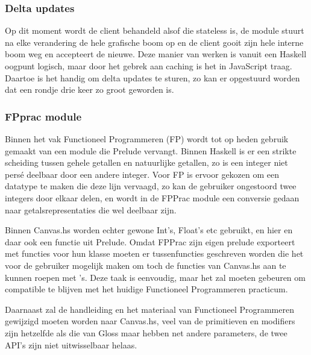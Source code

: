 \subsubsection{Delta updates} \label{subsub:deltas}
Op dit moment wordt de client behandeld alsof die stateless is, de module stuurt na elke verandering de hele grafische boom op en de client gooit zijn hele interne boom weg en accepteert de nieuwe. Deze manier van werken is vanuit een Haskell oogpunt logisch, maar door het gebrek aan caching is het in JavaScript traag. Daartoe is het handig om delta updates te sturen, zo kan er opgestuurd worden dat een rondje drie keer zo groot geworden is.

\subsubsection{FPprac module}
Binnen het vak Functioneel Programmeren (FP) wordt tot op heden gebruik gemaakt van een module die Prelude vervangt. Binnen Haskell is er een strikte scheiding tussen gehele getallen en natuurlijke getallen, zo is een integer niet persé deelbaar door een andere integer. Voor FP is ervoor gekozen om een  datatype te maken die deze lijn vervaagd, zo kan de gebruiker ongestoord twee integers door elkaar delen, en wordt in de FPPrac module een conversie gedaan naar getalsrepresentaties die wel deelbaar zijn.

Binnen Canvas.hs worden echter gewone Int's, Float's etc gebruikt, en hier en daar ook een functie uit Prelude. Omdat FPPrac zijn eigen prelude exporteert met functies voor hun  klasse moeten er tussenfuncties geschreven worden die het voor de gebruiker mogelijk maken om toch de functies van Canvas.hs aan te kunnen roepen met 's. Deze taak is eenvoudig, maar het zal moeten gebeuren om compatible te blijven met het huidige Functioneel Programmeren practicum.

Daarnaast zal de handleiding en het materiaal van Functioneel Programmeren gewijzigd moeten worden naar Canvas.hs, veel van de primitieven en modifiers zijn hetzelfde als die van Gloss maar hebben net andere parameters, de twee API's zijn niet uitwisselbaar helaas.
